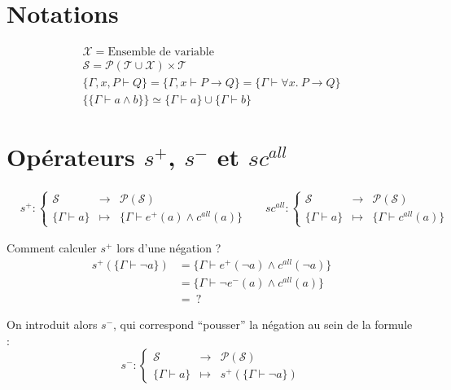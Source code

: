 \documentclass[12pt]{article}
\newcommand{\term}{\mathcal{T}}
\newcommand{\var}{\mathcal{X}}
\newcommand{\seq}{\mathcal{S}}
\newcommand{\partOf}[1]{\mathcal{P}(#1)}
\begin{document}
\section*{Notations}
\begin{gather*}
  \var = \textrm{Ensemble de variable} \\
  \seq = \partOf{\term \cup \var} \times \term  \\
  \{\Gamma, x, P \vdash Q \} = \{\Gamma, x \vdash P \rightarrow Q \} =  \{\Gamma \vdash \forall x.~ P \rightarrow Q \} \\
  \big\{\{\Gamma \vdash a \land b \}\big\} \simeq \{\Gamma \vdash a \} \cup \{\Gamma \vdash b \}
\end{gather*}

\section*{Opérateurs $s^+$, $s^-$ et $sc^{all}$}
\begin{align*}
   & s^+ : \left\{\begin{array}{ccc}
                    \seq                & \to     & \partOf{\seq}                              \\
                    \{\Gamma \vdash a\} & \mapsto & \{\Gamma \vdash e^+(a) \land c^{all} (a)\}
                  \end{array}\right. &
   & sc^{all}  : \left\{\begin{array}{ccc}
                          \seq                & \to     & \partOf{\seq}                 \\
                          \{\Gamma \vdash a\} & \mapsto & \{\Gamma \vdash c^{all} (a)\}
                        \end{array}\right.
\end{align*}
\bigskip

Comment calculer $s^+$ lors d'une négation ?
\begin{align*}
  s^+ (\{\Gamma \vdash \neg a\}) & = \{\Gamma \vdash e^+(\neg a) \land c^{all} (\neg a)\} \\
                                 & = \{\Gamma \vdash \neg e^-(a) \land c^{all} (a)\}      \\
                                 & = ~?
\end{align*}

On introduit alors $s^-$, qui correspond ``pousser'' la négation au sein de la formule :
\[
  s^- : \left\{
  \begin{array}{ccc}
    \seq                & \to     & \partOf{\seq}                 \\
    \{\Gamma \vdash a\} & \mapsto & s^+(\{\Gamma \vdash \neg a\})
  \end{array}
  \right.
\]
\end{document}
